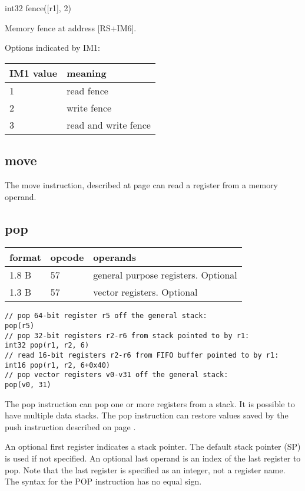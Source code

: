 \documentclass[forwardcom.tex]{subfiles}
\begin{document}
int32   fence([r1], 2)
\vv

Memory fence at address [RS+IM6].
\vv

Options indicated by IM1:

\begin{longtable}{|p{20mm}|p{50mm}|}
\endfirsthead
\endhead
\hline
\bfseries IM1 value & \bfseries meaning \\ \hline
1 & read fence \\ \hline
2 & write fence \\ \hline
3 & read and write fence \\ \hline
\end{longtable}
\vv

\subsection{move}
The move instruction, described at page \pageref{table:moveInstruction}
can read a register from a memory operand.

\subsection{pop}
\label{table:popInstruction}
\begin{tabular}{|p{12mm}|p{15mm}|p{100mm}|}
\hline
\bfseries format & \bfseries opcode & \bfseries operands \\ \hline
1.8 B & 57 & general purpose registers. Optional \\ 
1.3 B & 57 & vector registers. Optional \\ \hline
\end{tabular}
\vv

\begin{lstlisting}[frame=none]
// pop 64-bit register r5 off the general stack:
pop(r5)
// pop 32-bit registers r2-r6 from stack pointed to by r1:
int32 pop(r1, r2, 6)
// read 16-bit registers r2-r6 from FIFO buffer pointed to by r1:
int16 pop(r1, r2, 6+0x40)
// pop vector registers v0-v31 off the general stack:
pop(v0, 31)
\end{lstlisting}
\vv

The pop instruction can pop one or more registers from a stack. It is possible to have multiple data stacks. 
The pop instruction can restore values saved by the push instruction described on page \pageref{table:pushInstruction}.
\vv

An optional first register indicates a stack pointer. The default stack pointer (SP) is used if not specified. An optional last operand is an index of the last register to pop. Note that the last register is specified as an integer, not a register name.  The syntax for the POP instruction has no equal sign.
\vv
\end{document}
